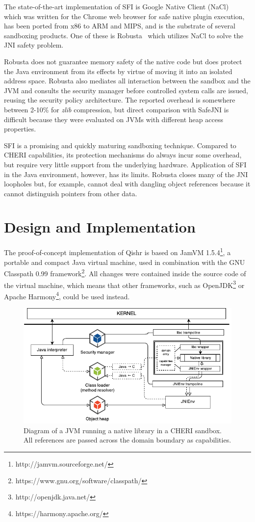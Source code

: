 \documentclass[a4paper,12pt,twoside,openright]{report}
\begin{document}
The state-of-the-art implementation of SFI is Google Native Client (NaCl)~\cite{5207638} which was written for the Chrome web browser for safe native plugin execution, has been ported from x86 to ARM and MIPS, and is the substrate of several sandboxing products. One of these is Robusta~\cite{siefers2010robusta} which utilizes NaCl to solve the JNI safety problem. 

Robusta does not guarantee memory safety of the native code but does protect the Java environment from its effects by virtue of moving it into an isolated address space. Robusta also mediates all interaction between the sandbox and the JVM and consults the security manager before controlled system calls are issued, reusing the security policy architecture. The reported overhead is somewhere between 2-10\% for \emph{zlib} compression, but direct comparison with SafeJNI is difficult because they were evaluated on JVMs with different heap access properties.

\label{sec:Robusta}
SFI is a promising and quickly maturing sandboxing technique. Compared to CHERI capabilities, its protection mechanisms do always incur some overhead, but require very little support from the underlying hardware. Application of SFI in the Java environment, however, has its limits. Robusta closes many of the JNI loopholes but, for example, cannot deal with dangling object references because it cannot distinguish pointers from other data.

\chapter{Design and Implementation} 

The proof-of-concept implementation of Qishr is based on JamVM 1.5.4\footnote{http://jamvm.sourceforge.net/}, a portable and compact Java virtual machine, used in combination with the GNU Classpath 0.99 framework\footnote{https://www.gnu.org/software/classpath/}. All changes were contained inside the source code of the virtual machine, which means that other frameworks, such as OpenJDK\footnote{http://openjdk.java.net/} or Apache Harmony\footnote{https://harmony.apache.org/}, could be used instead.

\begin{figure}
	\includegraphics[width=\textwidth]{dia_jni_caps.pdf}
	\caption{Diagram of a JVM running a native library in a CHERI sandbox. All references are passed across the domain boundary as capabilities.}
	\label{fig:OverviewCheriJNI}
\end{figure}
\end{document}
